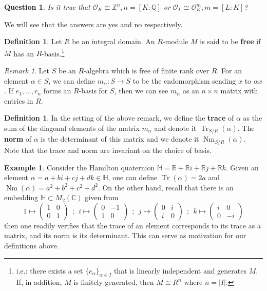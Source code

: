 \documentclass{tufte-handout} %
\newtheorem{quest}[thm]{Question}
\theoremstyle{definition}
\newtheorem{defn}[thm]{Definition}
\newtheorem{exmp}[thm]{Example}
\theoremstyle{remark}
\newtheorem{rem}[thm]{Remark}
\newcommand{\R}{\mathbb{R}}
\newcommand{\Z}{\mathbb{Z}}
\renewcommand{\C}{\mathbb{C}}
\newcommand{\Q}{\mathbb{Q}}
\newcommand{\mO}{\mathcal{O}}
\DeclareMathOperator{\Tr}{Tr}
\DeclareMathOperator{\Nm}{Nm}
\begin{document}
\begin{quest}
	Is it true that $\mO_K \cong \Z^n, n = [K:\Q]$ or $\mO_L \cong \mO_K^m, m = [L:K]$?
\end{quest}
We will see that the answers are yes and no respectively.
\begin{defn}
	Let $R$ be an integral domain. An $R$-module $M$ is said to be \textbf{free} if $M$ has an $R$-basis.\footnote{i.e.: there exists a set $\{e_{\alpha}\}_{\alpha \in I}$ that is linearly independent and generates $M$. If, in addition, $M$ is finitely generated, then $M \cong R^n$ where $n = |I|$.}
\end{defn}
\begin{rem}
	Let $S$ be an $R$-algebra which is free of finite rank over $R$. For an element $\alpha \in S$, we can define $m_{\alpha}: S\rightarrow S$ to be the endomorphism sending $x$ to $\alpha x$. If $e_1, \dots, e_n$ forms an $R$-basis for $S$, then we can see $m_{\alpha}$ as an $n\times n$ matrix with entries in $R$.
\end{rem}
\begin{defn}
	In the setting of the above remark, we define the \textbf{trace} of $\alpha$ as the sum of the diagonal elements of the matrix $m_{\alpha}$ and denote it $\Tr_{S/R}(\alpha)$. The \textbf{norm} of $\alpha$ is the determinant of this matrix and we denote it $\Nm_{S/R}(\alpha)$. Note that the trace and norm are invariant on the choice of basis.
\end{defn}
\begin{exmp}\label{normandtracequaternion}
	Consider the Hamilton quaternion $\mathbb{H} = \R + \R i + \R j + \R k$. Given an element $\alpha = a + bi + cj + dk \in \mathbb{H}$, one can define $\Tr(\alpha) = 2a$ and $\Nm(\alpha) = a^2 + b^2 + c^2 + d^2$. On the other hand, recall that there is an embedding $\mathbb{H} \subset M_2(\C)$ given from
	\[
	    1 \mapsto \begin{pmatrix} 1 & 0 \\ 0 & 1 \end{pmatrix} \ \ ; \ \ i \mapsto \begin{pmatrix} 0 & -1 \\ 1 & 0 \end{pmatrix} \ \ ; \ \ j \mapsto \begin{pmatrix} 0 & i \\ i & 0 \end{pmatrix} \ \ ; \ \ k \mapsto \begin{pmatrix} i & 0 \\ 0 & -i \end{pmatrix}
	\]
	then one readily verifies that the trace of an element corresponds to its trace as a matrix, and its norm is its determinant. This can serve as motivation for our definitions above.
\end{exmp}
\end{document}
